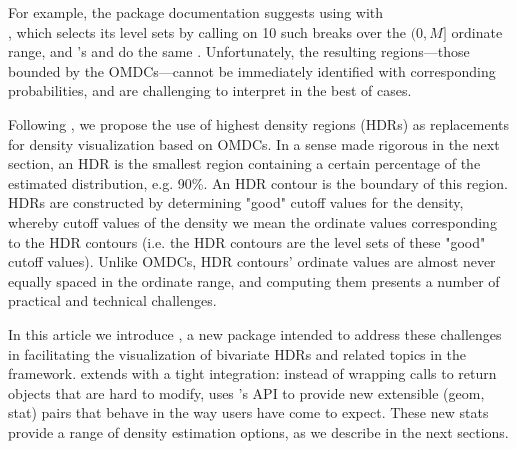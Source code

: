 For example, the  package documentation suggests using  with \\ , which selects its level sets by calling  on 10 such breaks over the $(0,M]$ ordinate range, and 's  and  do the same \citep{mass, wickham_ggplot2_2009, wilkinson_grammar_2005}.
Unfortunately, the resulting regions---those bounded by the OMDCs---cannot be immediately identified with corresponding probabilities, and are challenging to interpret in the best of cases.

Following \cite{hyndman_computing_1996}, we propose the use of highest density regions (HDRs) as replacements for density visualization based on OMDCs.
In a sense made rigorous in the next section, an HDR is the smallest region containing a certain percentage of the estimated distribution, e.g. 90\%.
An HDR contour is the boundary of this region.
HDRs are constructed by determining "good" cutoff values for the density, whereby cutoff values of the density we mean the ordinate values corresponding to the HDR contours
(i.e. the HDR contours are the level sets of these "good" cutoff values).
Unlike OMDCs, HDR contours' ordinate values are almost never equally spaced in the ordinate range, and computing them presents a number of practical and technical challenges.

In this article we introduce , a new  package intended to address these challenges in facilitating the visualization of bivariate HDRs and related topics in the  framework.
 extends  with a tight integration: instead of wrapping  calls to return  objects that are hard to modify,  uses 's API to provide new extensible (geom, stat) pairs that behave in the way  users have come to expect.
These new stats provide a range of density estimation options, as we describe in the next sections.





